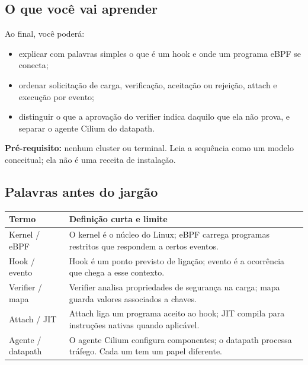 \documentclass[12pt,openany,oneside,a4paper,chapter=TITLE,english,brazil]{abntex2}
\providecommand{\tightlist}{\setlength{\itemsep}{0pt}\setlength{\parskip}{0pt}}
\begin{document}
\subsection*{O que você vai aprender}\label{o-que-vocuxea-vai-aprender}

Ao final, você poderá:

\begin{itemize}
\tightlist
\item
  explicar com palavras simples o que é um hook e onde um programa eBPF se conecta;
\item
  ordenar solicitação de carga, verificação, aceitação ou rejeição, attach e execução por evento;
\item
  distinguir o que a aprovação do verifier indica daquilo que ela não prova, e separar o agente Cilium do datapath.
\end{itemize}

\textbf{Pré-requisito:} nenhum cluster ou terminal. Leia a sequência como um modelo conceitual; ela não é uma receita de instalação.

\subsection*{Palavras antes do jargão}\label{palavras-antes-do-jarguxe3o-1}

\begin{quadro}[!htbp]
\caption{Vocabulário em uma frase}
\footnotesize
\begin{tabularx}{\textwidth}{|>{\raggedright\arraybackslash\hsize=0.586\hsize}X|>{\raggedright\arraybackslash\hsize=1.414\hsize}X|}
\hline
\textbf{Termo} & \textbf{Definição curta e limite} \\
\hline
Kernel / eBPF & O kernel é o núcleo do Linux; eBPF carrega programas restritos que
respondem a certos eventos. \\
\hline
Hook / evento & Hook é um ponto previsto de ligação; evento é a ocorrência que chega a
esse contexto. \\
\hline
Verifier / mapa & Verifier analisa propriedades de segurança na carga; mapa guarda valores
associados a chaves. \\
\hline
Attach / JIT & Attach liga um programa aceito ao hook; JIT compila para instruções
nativas quando aplicável. \\
\hline
Agente / datapath & O agente Cilium configura componentes; o datapath processa tráfego. Cada
um tem um papel diferente. \\
\hline
\end{tabularx}
\end{quadro}
\end{document}
